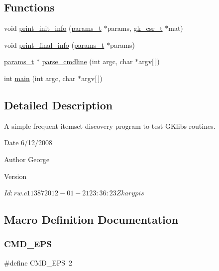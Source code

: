 \subsection*{Functions}
\begin{DoxyCompactItemize}
\item 
void \hyperlink{a00864_a2270624f104a1d261314dd112e4a1d1d}{print\+\_\+init\+\_\+info} (\hyperlink{a00706}{params\+\_\+t} $\ast$params, \hyperlink{a00634}{gk\+\_\+csr\+\_\+t} $\ast$mat)
\item 
void \hyperlink{a00864_a702976a4c55992ddbfc1918ec1b70943}{print\+\_\+final\+\_\+info} (\hyperlink{a00706}{params\+\_\+t} $\ast$params)
\item 
\hyperlink{a00706}{params\+\_\+t} $\ast$ \hyperlink{a00864_a0e7ce196a2f8882777957bf898739f6f}{parse\+\_\+cmdline} (int argc, char $\ast$argv\mbox{[}$\,$\mbox{]})
\item 
int \hyperlink{a00864_a0ddf1224851353fc92bfbff6f499fa97}{main} (int argc, char $\ast$argv\mbox{[}$\,$\mbox{]})
\end{DoxyCompactItemize}


\subsection{Detailed Description}
A simple frequent itemset discovery program to test G\+Klib\textquotesingle{}s routines. 

\begin{DoxyDate}{Date}
6/12/2008 
\end{DoxyDate}
\begin{DoxyAuthor}{Author}
George 
\end{DoxyAuthor}
\begin{DoxyVersion}{Version}
\begin{DoxyVerb}$Id: rw.c 11387 2012-01-21 23:36:23Z karypis $ \end{DoxyVerb}
 
\end{DoxyVersion}


\subsection{Macro Definition Documentation}
\mbox{\label{a00864_aebb6662065473a711abeccb460b3979c}} 
\subsubsection{\texorpdfstring{C\+M\+D\+\_\+\+E\+PS}{CMD\_EPS}}
{\footnotesize\ttfamily \#define C\+M\+D\+\_\+\+E\+PS~2}

